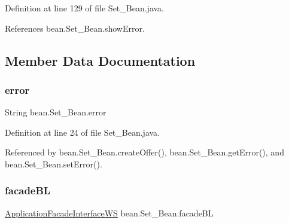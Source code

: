 Definition at line 129 of file Set\+\_\+\+Bean.\+java.


\begin{DoxyCode}{0}

\end{DoxyCode}


References bean.\+Set\+\_\+\+Bean.\+show\+Error.



\subsection{Member Data Documentation}
\mbox{\label{classbean_1_1Set__Bean_aa0023cab21fcce9d36c517f53940f3ff}} 
\subsubsection{\texorpdfstring{error}{error}}
{\footnotesize\ttfamily String bean.\+Set\+\_\+\+Bean.\+error\hspace{0.3cm}{\ttfamily [package]}}



Definition at line 24 of file Set\+\_\+\+Bean.\+java.



Referenced by bean.\+Set\+\_\+\+Bean.\+create\+Offer(), bean.\+Set\+\_\+\+Bean.\+get\+Error(), and bean.\+Set\+\_\+\+Bean.\+set\+Error().

\mbox{\label{classbean_1_1Set__Bean_afdf90e7df10b28094116c50ee84df11d}} 
\subsubsection{\texorpdfstring{facadeBL}{facadeBL}}
{\footnotesize\ttfamily \mbox{\hyperlink{interfacebusinessLogic_1_1ApplicationFacadeInterfaceWS}{Application\+Facade\+Interface\+WS}} bean.\+Set\+\_\+\+Bean.\+facade\+BL\hspace{0.3cm}{\ttfamily [private]}}



